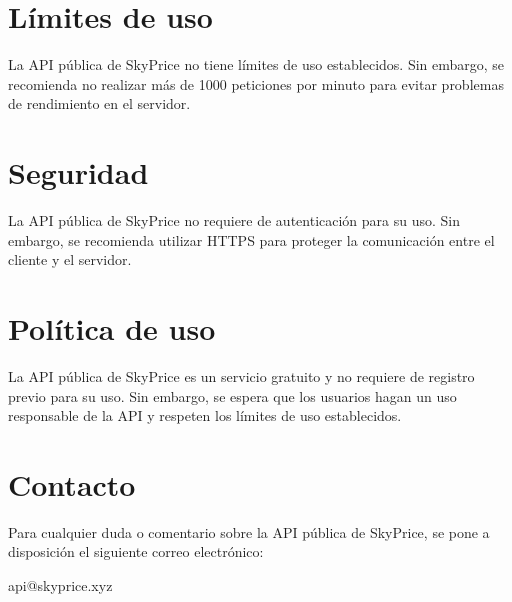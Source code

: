 \section{Límites de uso}
La API pública de SkyPrice no tiene límites de uso establecidos. Sin embargo, se
recomienda no realizar más de 1000 peticiones por minuto para evitar problemas de
rendimiento en el servidor.

\section{Seguridad}
La API pública de SkyPrice no requiere de autenticación para su uso. Sin embargo,
se recomienda utilizar HTTPS para proteger la comunicación entre el cliente y el
servidor.

\section{Política de uso}
La API pública de SkyPrice es un servicio gratuito y no requiere de registro previo
para su uso. Sin embargo, se espera que los usuarios hagan un uso responsable de la
API y respeten los límites de uso establecidos.

\section{Contacto}
Para cualquier duda o comentario sobre la API pública de SkyPrice, se pone a
disposición el siguiente correo electrónico:

\begin{center}
api@skyprice.xyz
\end{center}


